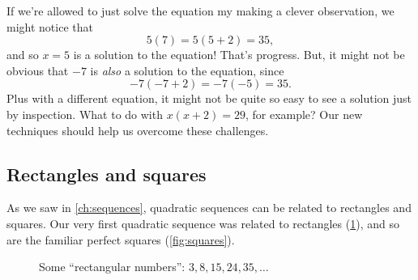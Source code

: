 If we're allowed to just solve the equation my making a clever observation, we might notice that \[5(7) = 5(5+2)=35,\] and so $x=5$ is a solution to the equation! That's progress. But, it might not be obvious that $-7$ is \textit{also} a solution to the equation, since \[-7(-7+2) = -7(-5) = 35.\] Plus with a different equation, it might not be quite so easy to see a solution just by inspection. What to do with $x(x+2)=29$, for example? Our new techniques should help us overcome these challenges.

\subsection{Rectangles and squares}

As we saw in \cref{ch:sequences}, quadratic sequences can be related to rectangles and squares. Our very first quadratic sequence was related to rectangles (\cref{fig:rects}), and so are the familiar perfect squares (\cref{fig:squares}).

\begin{figure}[!htbp]
\centering
{}
\caption{Some ``rectangular numbers'': $3, 8, 15, 24, 35, \dotsc$}
\label{fig:rects}
\end{figure}

